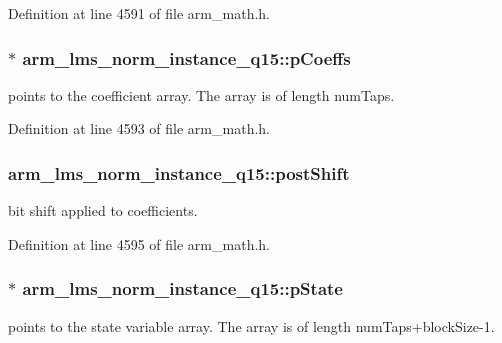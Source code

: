 Definition at line 4591 of file arm\-\_\-math.\-h.

\hypertarget{structarm__lms__norm__instance__q15_ae7bca648c75a2ffa02d87852bb78bc8a}{
\subsubsection[{p\-Coeffs}]{$\ast$ arm\-\_\-lms\-\_\-norm\-\_\-instance\-\_\-q15\-::p\-Coeffs}}\label{structarm__lms__norm__instance__q15_ae7bca648c75a2ffa02d87852bb78bc8a}
points to the coefficient array. The array is of length num\-Taps. 

Definition at line 4593 of file arm\-\_\-math.\-h.

\hypertarget{structarm__lms__norm__instance__q15_aa0d435fbcf7dedb7179d4467e9b79e9f}{
\subsubsection[{post\-Shift}]{ arm\-\_\-lms\-\_\-norm\-\_\-instance\-\_\-q15\-::post\-Shift}}\label{structarm__lms__norm__instance__q15_aa0d435fbcf7dedb7179d4467e9b79e9f}
bit shift applied to coefficients. 

Definition at line 4595 of file arm\-\_\-math.\-h.

\hypertarget{structarm__lms__norm__instance__q15_aa4de490b3bdbd03561b76ee07901c8e3}{
\subsubsection[{p\-State}]{$\ast$ arm\-\_\-lms\-\_\-norm\-\_\-instance\-\_\-q15\-::p\-State}}\label{structarm__lms__norm__instance__q15_aa4de490b3bdbd03561b76ee07901c8e3}
points to the state variable array. The array is of length num\-Taps+block\-Size-\/1. 


